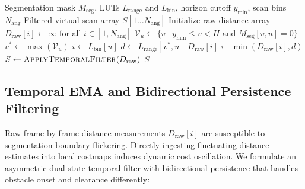 \documentclass{ieeeaccess}
\begin{document}
\begin{algorithm}[t]
\caption{Virtual LaserScan Generation}
\label{alg:virtual_scan}
\begin{algorithmic}[1]
\Require Segmentation mask $M_{\mathrm{seg}}$, LUTs $L_{\mathrm{range}}$ and $L_{\mathrm{bin}}$, horizon cutoff $y_{\min}$, scan bins $N_{\mathrm{ang}}$
\Ensure Filtered virtual scan array $S[1 \dots N_{\mathrm{ang}}]$
\State Initialize raw distance array $D_{\mathrm{raw}}[i] \gets \infty$ for all $i \in [1, N_{\mathrm{ang}}]$
    \State $\mathcal{V}_u \gets \{v \mid y_{\min} \le v < H \text{ and } M_{\mathrm{seg}}[v, u] = 0\}$
        \State $v^* \gets \max(\mathcal{V}_u)$ 
        \State $i \gets L_{\mathrm{bin}}[u]$
        \State $d \gets L_{\mathrm{range}}[v^*, u]$
        \State $D_{\mathrm{raw}}[i] \gets \min(D_{\mathrm{raw}}[i], d)$
    \EndIf
\EndFor
\State $S \gets \textsc{ApplyTemporalFilter}(D_{\mathrm{raw}})$
\State \Return $S$
\end{algorithmic}
\end{algorithm}

\subsection{Temporal EMA and Bidirectional Persistence Filtering}
\label{subsec:temporal_filter}
Raw frame-by-frame distance measurements $D_{\mathrm{raw}}[i]$ are susceptible to segmentation boundary flickering. Directly ingesting fluctuating distance estimates into local costmaps induces dynamic cost oscillation. We formulate an asymmetric dual-state temporal filter with bidirectional persistence that handles obstacle onset and clearance differently:
\end{document}
